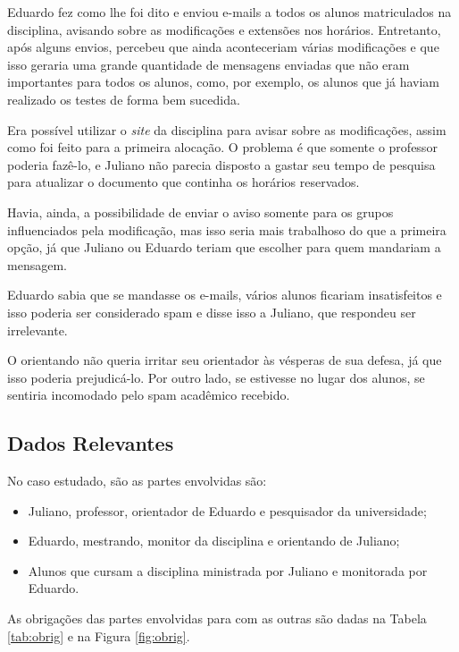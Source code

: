 \documentclass[a4paper,dvipdfm]{article}
\begin{document}
	Eduardo fez como lhe foi dito e enviou e-mails a todos os alunos matriculados na disciplina, avisando sobre as modificações e extensões nos horários.
	Entretanto, após alguns envios, percebeu que ainda aconteceriam várias modificações e que isso geraria uma grande quantidade de mensagens enviadas que não eram importantes para todos os alunos, como, por exemplo, os alunos que já haviam realizado os testes de forma bem sucedida.

	Era possível utilizar o \emph{site} da disciplina para avisar sobre as modificações, assim como foi feito para a primeira alocação. 
	O problema é que somente o professor poderia fazê-lo, e Juliano não parecia disposto a gastar seu tempo de pesquisa para atualizar o documento que continha os horários reservados.

	Havia, ainda, a possibilidade de enviar o aviso somente para os grupos influenciados pela modificação, mas isso seria mais trabalhoso do que a primeira opção, já que Juliano ou Eduardo teriam que escolher para quem mandariam a mensagem.
	
	Eduardo sabia que se mandasse os e-mails, vários alunos ficariam insatisfeitos e isso poderia ser considerado spam e disse isso a Juliano, que respondeu ser irrelevante.

	O orientando não queria irritar seu orientador às vésperas de sua defesa, já que isso poderia prejudicá-lo. 
	Por outro lado, se estivesse no lugar dos alunos, se sentiria incomodado pelo spam acadêmico recebido.

\newpage
	\subsection{Dados Relevantes}
		No caso estudado, são as partes envolvidas são:
		\begin{itemize}
			\item Juliano, professor, orientador de Eduardo e pesquisador da universidade;
			\item Eduardo, mestrando, monitor da disciplina e orientando de Juliano;
			\item Alunos que cursam a disciplina ministrada por Juliano e monitorada por Eduardo. 
		\end{itemize}

		As obrigações das partes envolvidas para com as outras são dadas na Tabela \ref{tab:obrig} e na Figura \ref{fig:obrig}.
\end{document}
